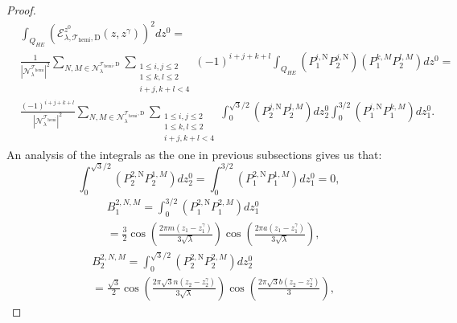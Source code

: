 \documentclass{amsart}
\theoremstyle{definition}
\theoremstyle{remark}
\renewcommand\leq\leqslant
\numberwithin{equation}{section}
\theoremstyle{definition}
\theoremstyle{remark}
\begin{document}
\begin{proof}
	\begin{equation}
		\begin{aligned}
			&\int_{Q_{HE}}\left(\mathcal{E}_{\lambda,\mathcal{T}_\mathrm{hemi},\mathrm{D}}^{z^0}(z,z^\gamma)\right)^2dz^0=\\&\frac{1}{\left|\mathcal{N}_\lambda^{\mathcal{T}_\mathrm{hemi}}\right|^2}\sum_{N,M\in\mathcal{N}_\lambda^{\mathcal{T}_\mathrm{hemi},\mathrm{D}}}\sum_{\substack{1\leq i,j\leq 2\\1\leq k,l\leq 2\\i+j, k+l<4}}(-1)^{i+j+k+l}\int_{Q_{HE}}\left(P^{i,\mathrm{N}}_1P^{j,\mathrm{N}}_2\right)\left(P^{k,M}_1P^{l,M}_2\right)dz^0=\\&\frac{(-1)^{i+j+k+l}}{\left|\mathcal{N}_\lambda^{\mathcal{T}_\mathrm{hemi}}\right|^2}\sum_{N,M\in\mathcal{N}_\lambda^{\mathcal{T}_\mathrm{hemi},\mathrm{D}}}\sum_{\substack{1\leq i,j\leq 2\\1\leq k,l\leq 2\\i+j, k+l<4}}\int_0^{\sqrt{3}/2}\left(P^{j,\mathrm{N}}_2P^{l,M}_2\right)dz_2^0\int_{0}^{3/2}\left(P^{i,\mathrm{N}}_1P^{k,M}_1\right)dz_1^0.\end{aligned}\end{equation}
	An analysis of the integrals as the one in previous subsections gives us that:
	\begin{equation}
		\int_0^{\sqrt{3}/2}\left(P^{2,\mathrm{N}}_2P^{1,M}_2\right)dz_2^0=\int_{0}^{3/2}\left(P^{2,\mathrm{N}}_1P^{1,M}_1\right)dz_1^0=0,
	\end{equation}
	\begin{equation}
		\begin{aligned}
		   & B_1^{2,N,M}=\int_0^{3/2}\left(P^{2,\mathrm{N}}_1P^{2,M}_1\right)dz_1^0\\&=\frac{3}{2}\cos\left(\frac{2\pi m\left(z_1-z_1^\gamma\right)}{3\sqrt{\lambda}}\right)\cos\left(\frac{2\pi a\left(z_1-z_1^\gamma\right)}{3\sqrt{\lambda}}\right),
		\end{aligned}
	\end{equation}\begin{equation}
		\begin{aligned}
		    &B_2^{2,N,M}=\int_0^{\sqrt{3}/2}\left(P^{2,\mathrm{N}}_2P^{2,M}_2\right)dz_2^0\\&=\frac{\sqrt{3}}{2}\cos\left(\frac{2\pi\sqrt{3} n\left(z_2-z_2^\gamma\right)}{3\sqrt{\lambda}}\right)\cos\left(\frac{2\pi\sqrt{3} b\left(z_2-z_2^\gamma\right)}{3}\right),
		\end{aligned}
	\end{equation}

\end{proof}
\end{document}

